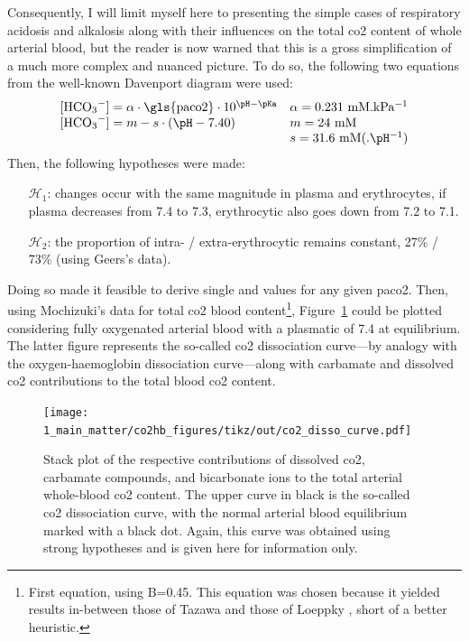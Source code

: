Consequently, I will limit myself here to presenting the simple cases of respiratory acidosis and alkalosis along with their influences on the total \gls{co2} content of whole arterial blood, but the reader is now warned that this is a gross simplification of a much more complex and nuanced picture. To do so, the following two equations from the well-known Davenport diagram were used\cite[Fig.~17]{davenport1974abc}:
\begin{equation}
	\begin{array}{ll}
		\ce{[HCO3^-]} = \alpha \cdot \text{\gls{paco2}}\cdot 10^{\pH - \pKa} & \alpha = \text{0.231~mM.kPa$^{-1}$}\\
		\ce{[HCO3^-]} = m - s \cdot (\pH - 7.40) & m = \text{24~mM}\\
		& s = \text{31.6~mM(.\pH$^{-1}$)}
	\end{array}
\end{equation}
Then, the following hypotheses were made:
\begin{itemize}
	\item[$\mathcal{H}_1$:] \pH{} changes occur with the same magnitude in plasma and erythrocytes, \ie{} if plasma \pH{} decreases from 7.4 to 7.3, erythrocytic \pH{} also goes down from 7.2 to 7.1.
	\item[$\mathcal{H}_2$:] the proportion of intra- / extra-erythrocytic \ce{[HCO3^-]} remains constant, \ie{} 27\% / 73\% (using Geers's data\cite{geers2000}).
\end{itemize}
Doing so made it feasible to derive single \ce{[HCO3^-]} and \pH{} values for any given \gls{paco2}. Then, using Mochizuki's data for total \gls{co2} blood content\cite{mochizuki1982}\footnote{First equation, using B=0.45. This equation was chosen because it yielded results in-between those of Tazawa \etal{}\cite{tazawa1983} and those of Loeppky \etal{}\cite{loeppky1983}, short of a better heuristic.}, Figure~\ref{fig:co2hb:co2_dissociation_curve} could be plotted considering fully oxygenated arterial blood with a plasmatic \pH{} of 7.4 at equilibrium. The latter figure represents the so-called \gls{co2} dissociation curve---by analogy with the oxygen-haemoglobin dissociation curve---along with carbamate and dissolved \gls{co2} contributions to the total blood \gls{co2} content.

\begin{figure}
	\centering
	\texttt{[image: 1\_main\_matter/co2hb\_figures/tikz/out/co2\_disso\_curve.pdf]}
	\caption[\gls{co2} dissociation curve.]{Stack plot of the respective contributions of dissolved \gls{co2}, carbamate compounds, and bicarbonate ions to the total arterial whole-blood \gls{co2} content. The upper curve in black is the so-called \gls{co2} dissociation curve, with the normal arterial blood equilibrium marked with a black dot. Again, this curve was obtained using strong hypotheses and is given here for information only.}
	\label{fig:co2hb:co2_dissociation_curve}
\end{figure}


